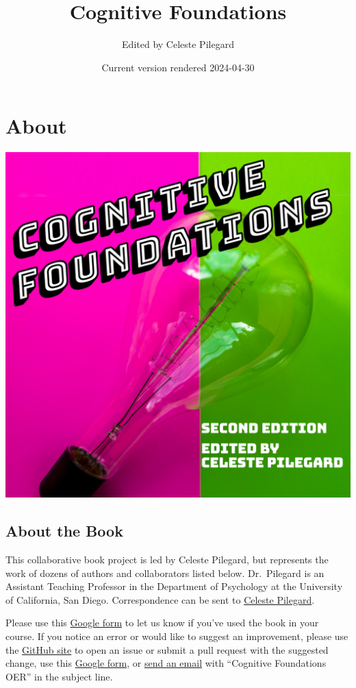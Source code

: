 \documentclass[
]{krantz}
\title{Cognitive Foundations}
\author{Edited by Celeste Pilegard}
\date{Current version rendered 2024-04-30}
\begin{document}
\maketitle

{
\setcounter{tocdepth}{1}
\tableofcontents
}
\hypertarget{about}{%
\chapter*{About}\label{about}}


\includegraphics{images/cover.png}

\hypertarget{about-the-book}{%
\section*{About the Book}\label{about-the-book}}


This collaborative book project is led by Celeste Pilegard, but represents the work of dozens of authors and collaborators listed below. Dr.~Pilegard is an Assistant Teaching Professor in the Department of Psychology at the University of California, San Diego. Correspondence can be sent to \href{mailto:pilegard@ucsd.edu}{Celeste Pilegard}.

Please use this \href{https://forms.gle/83CBvAgLuJshRfz37}{Google form} to let us know if you've used the book in your course. If you notice an error or would like to suggest an improvement, please use the \href{https://github.com/pilegard/cogfoundations}{GitHub site} to open an issue or submit a pull request with the suggested change, use this \href{https://forms.gle/83CBvAgLuJshRfz37}{Google form}, or \href{mailto:pilegard@ucsd.edu}{send an email} with ``Cognitive Foundations OER'' in the subject line.
\end{document}
